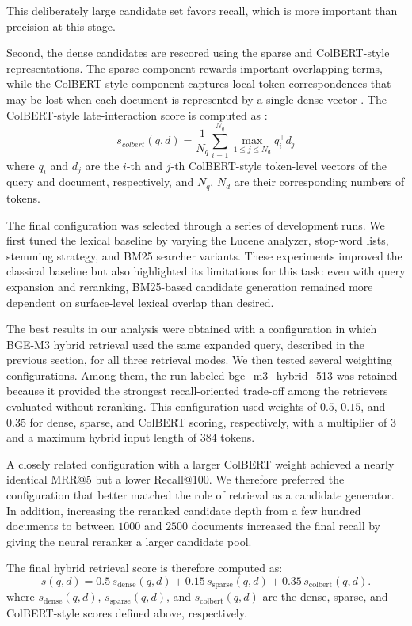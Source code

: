 This deliberately large candidate set favors recall, which is more important than precision at this stage.

Second, the dense candidates are rescored using the sparse and ColBERT-style representations. The sparse component rewards important overlapping terms, while the ColBERT-style component captures local token correspondences that may be lost when each document is represented by a single dense vector \cite{khattab2020colbert}.
The ColBERT-style late-interaction score is computed as \cite{khattab2020colbert}:
\[
    s_{colbert}(q,d)=\frac{1}{N_q}\sum_{i=1}^{N_q}\max_{1\le j\le N_d} q_i^\top d_j
\]
where $q_i$ and $d_j$ are the $i$-th and $j$-th ColBERT-style token-level vectors of the query and document, respectively, and $N_q$, $N_d$ are their corresponding numbers of tokens.

The final configuration was selected through a series of development runs. We first tuned the lexical baseline by varying the Lucene analyzer, stop-word lists, stemming strategy, and BM25 searcher variants. These experiments improved the classical baseline but also highlighted its limitations for this task: even with query expansion and reranking, BM25-based candidate generation remained more dependent on surface-level lexical overlap than desired.

The best results in our analysis were obtained with a configuration in which BGE-M3 hybrid retrieval used the same expanded query, described in the previous section, for all three retrieval modes. We then tested several weighting configurations. Among them, the run labeled bge\_m3\_hybrid\_513 was retained because it provided the strongest recall-oriented trade-off among the retrievers evaluated without reranking. This configuration used weights of $0.5$, $0.15$, and $0.35$ for dense, sparse, and ColBERT scoring, respectively, with a multiplier of $3$ and a maximum hybrid input length of $384$ tokens.

A closely related configuration with a larger ColBERT weight achieved a nearly identical MRR@5 but a lower Recall@100. We therefore preferred the configuration that better matched the role of retrieval as a candidate generator. In addition, increasing the reranked candidate depth from a few hundred documents to between $1000$ and $2500$ documents increased the final recall by giving the neural reranker a larger candidate pool.

The final hybrid retrieval score is therefore computed as:
\[
    s(q, d) =
    0.5\,s_{\text{dense}}(q, d)
    + 0.15\,s_{\text{sparse}}(q, d)
    + 0.35\,s_{\text{colbert}}(q, d).
\]
where $s_{\text{dense}}(q,d)$, $s_{\text{sparse}}(q,d)$, and $s_{\text{colbert}}(q,d)$ are the dense, sparse, and ColBERT-style scores defined above, respectively.


